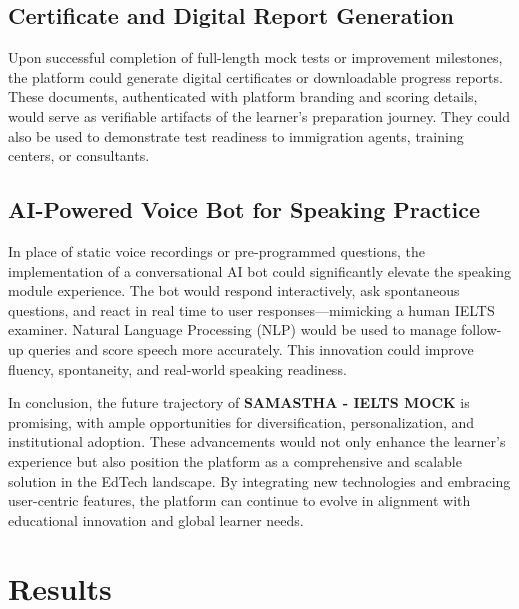 \documentclass[a4paper,12pt]{article}
\begin{document}
\vspace{0.5cm}

\subsection{Certificate and Digital Report Generation}

Upon successful completion of full-length mock tests or improvement milestones, the platform could generate digital certificates or downloadable progress reports. These documents, authenticated with platform branding and scoring details, would serve as verifiable artifacts of the learner’s preparation journey. They could also be used to demonstrate test readiness to immigration agents, training centers, or consultants.

\vspace{0.5cm}

\subsection{AI-Powered Voice Bot for Speaking Practice}

In place of static voice recordings or pre-programmed questions, the implementation of a conversational AI bot could significantly elevate the speaking module experience. The bot would respond interactively, ask spontaneous questions, and react in real time to user responses—mimicking a human IELTS examiner. Natural Language Processing (NLP) would be used to manage follow-up queries and score speech more accurately. This innovation could improve fluency, spontaneity, and real-world speaking readiness.

\vspace{0.5cm}

\noindent
In conclusion, the future trajectory of \textbf{SAMASTHA - IELTS MOCK} is promising, with ample opportunities for diversification, personalization, and institutional adoption. These advancements would not only enhance the learner’s experience but also position the platform as a comprehensive and scalable solution in the EdTech landscape. By integrating new technologies and embracing user-centric features, the platform can continue to evolve in alignment with educational innovation and global learner needs.


\newpage
\section{Results}
\end{document}
